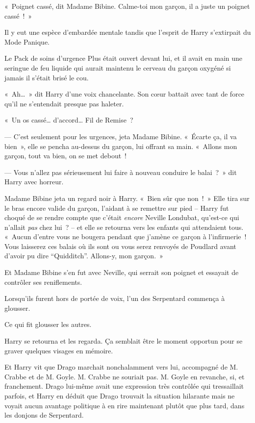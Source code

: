 «~Poignet cassé, dit Madame Bibine. Calme-toi mon garçon, il a juste un poignet cassé~!~»

Il y eut une espèce d'embardée mentale tandis que l'esprit de Harry s'extirpait du Mode Panique.

Le Pack de soins d'urgence Plus était ouvert devant lui, et il avait en main une seringue de feu liquide qui aurait maintenu le cerveau du garçon oxygéné si jamais il s'était brisé le cou.

«~Ah…~» dit Harry d'une voix chancelante. Son cœur battait avec tant de force qu'il ne s'entendait presque pas haleter.

«~Un os cassé… d'accord… Fil de Remise~?

--- C'est seulement pour les urgences, jeta Madame Bibine. «~Écarte ça, il va bien~», elle se pencha au-dessus du garçon, lui offrant sa main. «~Allons mon garçon, tout va bien, on se met debout~!

--- Vous n'allez pas sérieusement lui faire à nouveau conduire le balai~?~» dit Harry avec horreur.

Madame Bibine jeta un regard noir à Harry. «~Bien sûr que non~!~» Elle tira sur le bras encore valide du garçon, l'aidant à se remettre sur pied -- Harry fut choqué de se rendre compte que c'était \emph{encore} Neville Londubat, qu'est-ce qui n'allait \emph{pas} chez lui~? -- et elle se retourna vers les enfants qui attendaient tous. «~Aucun d'entre vous ne bougera pendant que j'amène ce garçon à l'infirmerie~! Vous laisserez ces balais où ils sont ou vous serez renvoyés de Poudlard avant d'avoir pu dire “Quidditch”. Allons-y, mon garçon.~»

Et Madame Bibine s'en fut avec Neville, qui serrait son poignet et essayait de contrôler ses reniflements.

Lorsqu'ils furent hors de portée de voix, l'un des Serpentard commença à glousser.

Ce qui fit glousser les autres.

Harry se retourna et les regarda. Ça semblait être le moment opportun pour se graver quelques visages en mémoire.

Et Harry vit que Drago marchait nonchalamment vers lui, accompagné de M. Crabbe et de M. Goyle. M. Crabbe ne souriait pas. M. Goyle en revanche, si, et franchement. Drago lui-même avait une expression très contrôlée qui tressaillait parfois, et Harry en déduit que Drago trouvait la situation hilarante mais ne voyait aucun avantage politique à en rire maintenant plutôt que plus tard, dans les donjons de Serpentard.

